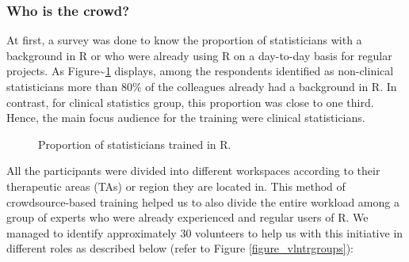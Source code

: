 \hypertarget{who-is-the-crowd}{%
\subsubsection{Who is the crowd?}\label{who-is-the-crowd}}

At first, a survey was done to know the proportion of statisticians with
a background in R or who were already using R on a day-to-day basis for
regular projects. As Figure\textasciitilde{}\ref{figure_Ruser} displays,
among the respondents identified as non-clinical statisticians more than
80\% of the colleagues already had a background in R. In contrast, for
clinical statistics group, this proportion was close to one third.
Hence, the main focus audience for the training were clinical
statisticians.

\begin{figure}[htbp]
  \centering
  \caption{Proportion of statisticians trained in R.}
  \label{figure_Ruser}
\end{figure}

All the participants were divided into different workspaces according to
their therapeutic areas (TAs) or region they are located in. This method
of crowdsource-based training helped us to also divide the entire
workload among a group of experts who were already experienced and
regular users of R. We managed to identify approximately 30 volunteers
to help us with this initiative in different roles as described below
(refer to Figure \ref{figure_vlntrgroups}):

